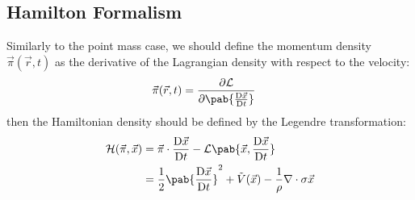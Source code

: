 \subsection{Hamilton Formalism}
Similarly to the point mass case, we should define the momentum density $\vec{\pi}(\vec{r}, t)$ as the derivative of the Lagrangian density with respect to the velocity:
\begin{align}
  \vec{\pi} (\vec{r}, t) & = \pdv{\lagr}{\pab{\mdv{\vec{x}}{t}}}
\end{align}
then the Hamiltonian density should be defined by the Legendre transformation:
\begin{align}
  \hami(\vec{\pi}, \vec{x}) & = \vec{\pi} \cdot \mdv{\vec{x}}{t} - \lagr \pab{\vec{x}, \mdv{\vec{x}}{t}}                               \\
                            & = \frac{1}{2} \pab{\mdv{\vec{x}}{t}}^2 + \tilde{V}(\vec{x}) - \frac{1}{\rho} \nabla \cdot \sigma \vec{x}
\end{align}


\cite{suzuki-leastActionFluid}




